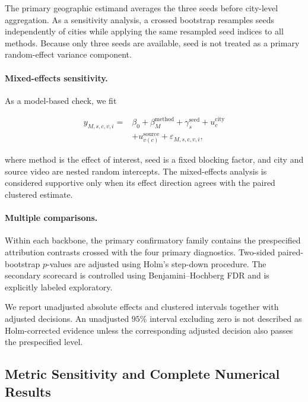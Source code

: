 The primary geographic estimand averages the three seeds before
city-level aggregation. As a sensitivity analysis, a crossed bootstrap
resamples seeds independently of cities while applying the same
resampled seed indices to all methods. Because only three seeds are
available, seed is not treated as a primary random-effect variance
component.

\paragraph{Mixed-effects sensitivity.}
As a model-based check, we fit

\begin{equation*}
\begin{aligned}
y_{M,s,c,v,i}
={}&
\beta_0
+
\beta_M^{\mathrm{method}}
+
\gamma_s^{\mathrm{seed}}
+
u_c^{\mathrm{city}}
\\
&+
u_{v(c)}^{\mathrm{source}}
+
\varepsilon_{M,s,c,v,i},
\end{aligned}
\end{equation*}

where method is the effect of interest, seed is a fixed blocking
factor, and city and source video are nested random intercepts. The
mixed-effects analysis is considered supportive only when its effect
direction agrees with the paired clustered estimate.

\paragraph{Multiple comparisons.}
Within each backbone, the primary confirmatory family contains the
prespecified attribution contrasts crossed with the four primary
diagnostics. Two-sided paired-bootstrap \(p\)-values are adjusted using
Holm's step-down procedure. The secondary scorecard is controlled using
Benjamini--Hochberg FDR and is explicitly labeled exploratory.

We report unadjusted absolute effects and clustered intervals together
with adjusted decisions. An unadjusted \(95\%\) interval excluding zero
is not described as Holm-corrected evidence unless the corresponding
adjusted decision also passes the prespecified level.


\subsection{Metric Sensitivity and Complete Numerical Results}
\label{app:metric_robustness}


